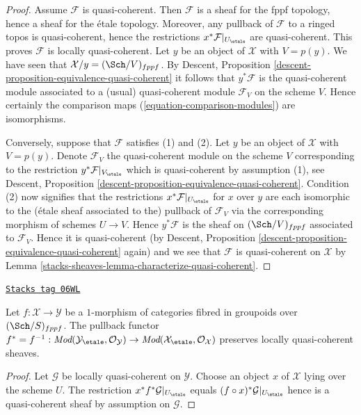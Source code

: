 \begin{proof}
Assume $\mathcal{F}$ is quasi-coherent. Then $\mathcal{F}$ is a sheaf
for the fppf topology, hence a sheaf for the \'etale topology. Moreover,
any pullback of $\mathcal{F}$ to a ringed topos is quasi-coherent, hence
the restrictions $x^*\mathcal{F}|_{U_\etale}$ are quasi-coherent.
This proves $\mathcal{F}$ is locally quasi-coherent.
Let $y$ be an object of $\mathcal{X}$ with $V = p(y)$.
We have seen that $\mathcal{X}/y = (\Sch/V)_{fppf}$. By
Descent, Proposition \ref{descent-proposition-equivalence-quasi-coherent}
it follows that $y^*\mathcal{F}$ is the quasi-coherent module
associated to a (usual) quasi-coherent module $\mathcal{F}_V$ on
the scheme $V$. Hence certainly the comparison maps
(\ref{equation-comparison-modules}) are isomorphisms.

\medskip\noindent
Conversely, suppose that $\mathcal{F}$ satisfies (1) and (2).
Let $y$ be an object of $\mathcal{X}$ with $V = p(y)$. Denote
$\mathcal{F}_V$ the quasi-coherent module on
the scheme $V$ corresponding to the restriction
$y^*\mathcal{F}|_{V_\etale}$ which is quasi-coherent by
assumption (1), see
Descent, Proposition \ref{descent-proposition-equivalence-quasi-coherent}.
Condition (2) now signifies that the restrictions
$x^*\mathcal{F}|_{U_\etale}$ for $x$ over $y$ are each
isomorphic to the (\'etale sheaf associated to the) pullback of $\mathcal{F}_V$
via the corresponding morphism of schemes $U \to V$.
Hence $y^*\mathcal{F}$ is the sheaf on $(\Sch/V)_{fppf}$
associated to $\mathcal{F}_V$. Hence it is quasi-coherent (by
Descent, Proposition \ref{descent-proposition-equivalence-quasi-coherent}
again) and we see that $\mathcal{F}$ is quasi-coherent on $\mathcal{X}$ by
Lemma \ref{stacks-sheaves-lemma-characterize-quasi-coherent}.
\end{proof}

\begin{lemma}
\label{stacks-sheaves-lemma-pullback-lqc}
\href{https://stacks.math.columbia.edu/tag/06WL}{\texttt{Stacks tag 06WL}}

Let $f : \mathcal{X} \to \mathcal{Y}$ be a $1$-morphism of categories
fibred in groupoids over $(\Sch/S)_{fppf}$. The pullback functor
$f^* = f^{-1} :
\textit{Mod}(\mathcal{Y}_\etale, \mathcal{O}_\mathcal{Y})
\to
\textit{Mod}(\mathcal{X}_\etale, \mathcal{O}_\mathcal{X})$
preserves locally quasi-coherent sheaves.
\end{lemma}

\begin{proof}
Let $\mathcal{G}$ be locally quasi-coherent on $\mathcal{Y}$.
Choose an object $x$ of $\mathcal{X}$ lying over the scheme $U$.
The restriction $x^*f^*\mathcal{G}|_{U_\etale}$ equals
$(f \circ x)^*\mathcal{G}|_{U_\etale}$
hence is a quasi-coherent sheaf by assumption on $\mathcal{G}$.
\end{proof}

